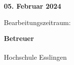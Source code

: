 \begin{titlepage}
\begin{center}
\large{\textbf{05. Februar 2024}}

\vspace{0.3cm} 

\large{Bearbeitungszeitraum: \timeFrame} \\ 

\vspace{1cm}

\large{\textbf{Betreuer}}\\
\vspace{0.2cm}
\supervisor\\
\normalsize{Hochschule Esslingen}\\
\vspace{0.2cm}


\end{center}
\end{titlepage}
\vfill